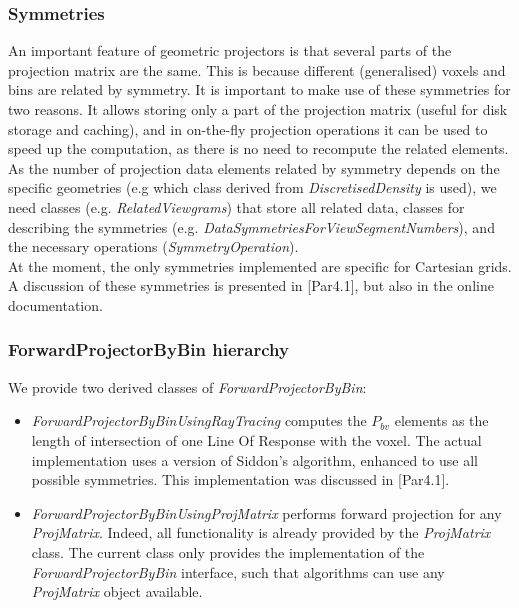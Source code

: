 \documentclass{article}
\begin{document}
\subsubsection{
Symmetries \label{sect:sect:symmetries}}

An important feature of geometric projectors is that several 
parts of the projection matrix are the same. This is because 
different (generalised) voxels and bins are related by symmetry. 
It is important to make use of these symmetries for two reasons. 
It allows storing only a part of the projection matrix (useful 
for disk storage and caching), and in on-the-fly projection operations 
it can be used to speed up the computation, as there is no need 
to recompute the related elements. As the number of projection 
data elements related by symmetry depends on the specific geometries 
(e.g which class derived from \textit{DiscretisedDensity} is used), 
we need classes (e.g. \textit{RelatedViewgrams}) that store all related 
data, classes for describing the symmetries (e.g. \textit{DataSymmetriesForViewSegmentNumbers}), 
and the necessary operations (\textit{SymmetryOperation}). \\
At the moment, the only symmetries implemented are specific for 
Cartesian grids. A discussion of these symmetries is presented 
in [Par4.1], but also in the online documentation.

\subsubsection{
ForwardProjectorByBin hierarchy}

We provide two derived classes of \textit{ForwardProjectorByBin}: 
\begin{itemize}
\item 
\textit{ForwardProjectorByBinUsingRayTracing} computes the $P_{bv}$ 
elements as the length of intersection of one Line Of Response 
with the voxel. The actual implementation uses a version of Siddon's 
algorithm, enhanced to use all possible symmetries. This implementation 
was discussed in [Par4.1].
\item 
\textit{ForwardProjectorByBinUsingProjMatrix} performs forward projection 
for any \textit{ProjMatrix}. Indeed, all functionality is already 
provided by the \textit{ProjMatrix} class. The current class only 
provides the implementation of the \textit{ForwardProjectorByBin} 
interface, such that algorithms can use any \textit{ProjMatrix} object 
available.
\end{itemize}
\end{document}
